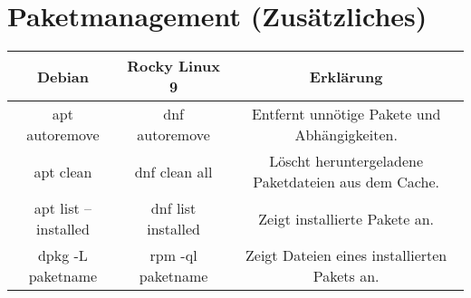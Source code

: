 \documentclass{article}
\begin{document}
\section*{Paketmanagement (Zusätzliches)}

\begin{tabularx}{\textwidth}{CCC}
  \textbf{Debian} & \textbf{Rocky Linux 9} & \textbf{Erklärung} \\
  \hline
  apt autoremove & dnf autoremove & Entfernt unnötige Pakete und Abhängigkeiten. \\
  apt clean & dnf clean all & Löscht heruntergeladene Paketdateien aus dem Cache. \\
  apt list --installed & dnf list installed & Zeigt installierte Pakete an. \\
  dpkg -L paketname & rpm -ql paketname & Zeigt Dateien eines installierten Pakets an. \\
\end{tabularx}
\end{document}
